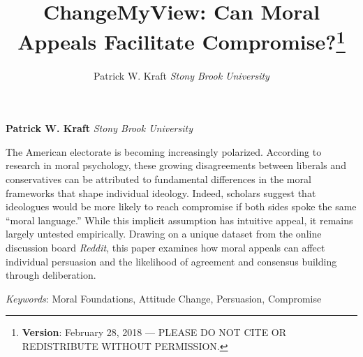\documentclass[12pt,]{article}
\title{ChangeMyView: Can Moral Appeals Facilitate Compromise?\thanks{\textbf{Version}: February 28, 2018 --- PLEASE DO NOT CITE OR
REDISTRIBUTE WITHOUT PERMISSION.}  }
\author{\Large Patrick W. Kraft\vspace{0.05in} \newline\normalsize\emph{Stony Brook University}  }
\date{}
\newcommand*{\authorfont}{\fontfamily{phv}\selectfont}
\renewenvironment{abstract}
 {{%
    \setlength{\leftmargin}{0mm}
    \setlength{\rightmargin}{\leftmargin}%
  }%
  \relax}
 {\endlist}
\begin{document}
	
%

{%
\setlength{\parindent}{0pt}
\thispagestyle{plain}
{\fontsize{18}{20}\selectfont\raggedright 
\maketitle  %

}

{
   \vskip 13.5pt\relax \normalsize\fontsize{11}{12} 
\textbf{\authorfont Patrick W. Kraft} \hskip 15pt \emph{\small Stony Brook University}   

}

}








\begin{abstract}

    \hbox{\vrule height .2pt width 39.14pc}

    \vskip 8.5pt %

\noindent The American electorate is becoming increasingly polarized. According to
research in moral psychology, these growing disagreements between
liberals and conservatives can be attributed to fundamental differences
in the moral frameworks that shape individual ideology. Indeed, scholars
suggest that ideologues would be more likely to reach compromise if both
sides spoke the same ``moral language.'' While this implicit assumption
has intuitive appeal, it remains largely untested empirically. Drawing
on a unique dataset from the online discussion board \emph{Reddit}, this
paper examines how moral appeals can affect individual persuasion and
the likelihood of agreement and consensus building through deliberation.


\vskip 8.5pt \noindent \emph{Keywords}: Moral Foundations, Attitude Change, Persuasion, Compromise \par

    \hbox{\vrule height .2pt width 39.14pc}



\end{abstract}


\vskip 6.5pt
\end{document}
